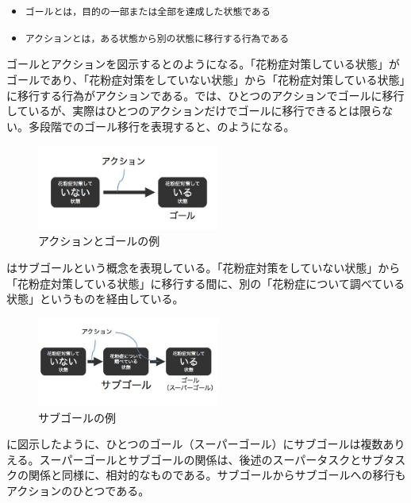 \documentclass[submit,techreq]{ipsj}
\def\|{\verb|}
\begin{document}
\begin{itemize}
\item \|ゴールとは，目的の一部または全部を達成した状態である|
\item \|アクションとは，ある状態から別の状態に移行する行為である|
\end{itemize}

ゴールとアクションを図示するとのようになる。「花粉症対策している状態」がゴールであり、「花粉症対策をしていない状態」から「花粉症対策している状態」に移行する行為がアクションである。では、ひとつのアクションでゴールに移行しているが、実際はひとつのアクションだけでゴールに移行できるとは限らない。多段階でのゴール移行を表現すると、のようになる。

\begin{figure}[tb]
\includegraphics[width=6cm, bb=0 0 400 300]{action_goal.jpg}
\caption{アクションとゴールの例}
\label{fig:action_goal}
\end{figure}

はサブゴールという概念を表現している。「花粉症対策をしていない状態」から「花粉症対策している状態」に移行する間に、別の「花粉症について調べている状態」というものを経由している。


\begin{figure}[tb]
\includegraphics[width=6cm, bb=0 0 450 300]{sub_goal.jpg}
\caption{サブゴールの例}
\label{fig:sub_goal}
\end{figure}



に図示したように、ひとつのゴール（スーパーゴール）にサブゴールは複数ありえる。スーパーゴールとサブゴールの関係は、後述のスーパータスクとサブタスクの関係と同様に、相対的なものである。サブゴールからサブゴールへの移行もアクションのひとつである。
\end{document}
